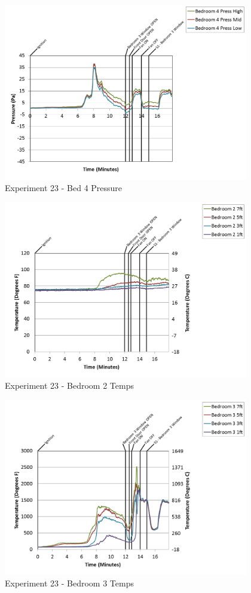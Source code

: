 \documentclass{article}
\begin{document}
\begin{appendices}
\begin{figure}[h!]
	\centering
	\includegraphics[height=3.05in]{0_Images/Results_Charts/Exp_23_Charts/Bed4Pressure.png}
	\caption{Experiment 23 - Bed 4 Pressure}
\end{figure}

\clearpage

\begin{figure}[h!]
	\centering
	\includegraphics[height=3.05in]{0_Images/Results_Charts/Exp_23_Charts/Bedroom2Temps.png}
	\caption{Experiment 23 - Bedroom 2 Temps}
\end{figure}


\begin{figure}[h!]
	\centering
	\includegraphics[height=3.05in]{0_Images/Results_Charts/Exp_23_Charts/Bedroom3Temps.png}
	\caption{Experiment 23 - Bedroom 3 Temps}
\end{figure}


\end{appendices}
\end{document}
